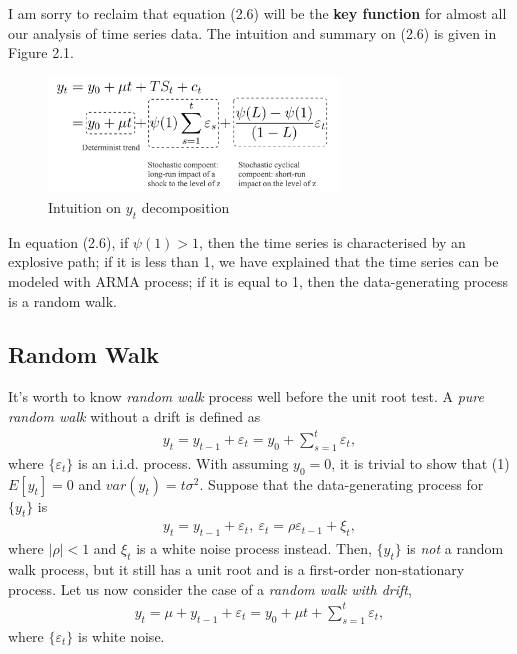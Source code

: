 \documentclass[12pt]{article}
\theoremstyle{definition}
\numberwithin{equation}{section}
\numberwithin{figure}{section}
\numberwithin{table}{section}
\begin{document}
I am sorry to reclaim that equation (2.6) will be the \textbf{key function} for almost all our analysis of time series data. The intuition and summary on (2.6) is given in Figure 2.1.
\begin{figure}[H]
  \centering
  \includegraphics[width=0.69\textwidth]{ydecom}
  \caption{Intuition on $y_t$ decomposition}
\end{figure}

In equation (2.6), if $\psi(1) > 1$, then the time series is characterised by an explosive path; if it is less than 1, we have explained that the time series can be modeled with ARMA process; if it is equal to 1, then the data-generating process is a random walk.

\subsection{Random Walk}

It's worth to know \textit{random walk} process well before the unit root test. A \textit{pure random walk} without a drift is defined as
\begin{align}
  y_t = y_{t-1} + \varepsilon_t = y_0 + \sum_{s=1}^t \varepsilon_t ,
\end{align}
where $\{\varepsilon_t\}$ is an i.i.d. process. With assuming $y_0 = 0$, it is trivial to show that (1) $E[y_t] = 0$ and $var(y_t) = t \sigma^2$. Suppose that the data-generating process for $\{y_t\}$ is
\begin{align}
  y_t = y_{t-1} + \varepsilon_t, \ \varepsilon_t = \rho \varepsilon_{t-1} + \xi_t,
\end{align}
where $|\rho| < 1$ and $\xi_t$ is a white noise process instead. Then, $\{y_t\}$ is \textit{not} a random walk process, but it still has a unit root and is a first-order non-stationary process. Let us now consider the case of a \textit{random walk with drift},
\begin{align}
  y_t = \mu + y_{t-1} + \varepsilon_t = y_0 + \mu t + \sum_{s=1}^t \varepsilon_t ,
\end{align}
where $\{\varepsilon_t \}$ is white noise.
\end{document}
